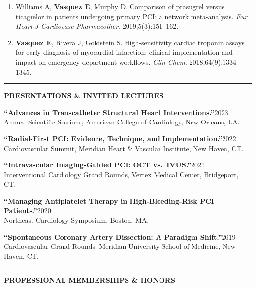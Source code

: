\documentclass[11pt,a4paper]{article}
\newcommand{\cvsection}[1]{%
  \vspace{1.2em}%
  \noindent
  {\color{primary}\rule{3.5pt}{15pt}}\hspace{8pt}%
  {\color{primary}\Large\bfseries\MakeUppercase{#1}}%
  \vspace{0.2em}%
  \par\noindent{\color{primary!25}\rule{\textwidth}{0.5pt}}%
  \vspace{0.6em}%
}
\begin{document}
{\begin{enumerate}[leftmargin=*, itemsep=2pt, topsep=0pt]
\item Williams A, \textbf{Vasquez E}, Murphy D. Comparison of prasugrel versus ticagrelor in patients undergoing primary PCI: a network meta-analysis. \textit{Eur Heart J Cardiovasc Pharmacother}. 2019;5(3):151--162.

\item \textbf{Vasquez E}, Rivera J, Goldstein S. High-sensitivity cardiac troponin assays for early diagnosis of myocardial infarction: clinical implementation and impact on emergency department workflows. \textit{Clin Chem}. 2018;64(9):1334--1345.

\end{enumerate}
}

\cvsection{Presentations \& Invited Lectures}

\vspace{-2pt}
{\color{darktext}
\noindent\textbf{\color{primary}``Advances in Transcatheter Structural Heart Interventions.''}\hfill 2023\\
Annual Scientific Sessions, American College of Cardiology, New Orleans, LA.

\vspace{3pt}
\noindent\textbf{\color{primary}``Radial-First PCI: Evidence, Technique, and Implementation.''}\hfill 2022\\
Cardiovascular Summit, Meridian Heart \& Vascular Institute, New Haven, CT.

\vspace{3pt}
\noindent\textbf{\color{primary}``Intravascular Imaging-Guided PCI: OCT vs.\ IVUS.''}\hfill 2021\\
Interventional Cardiology Grand Rounds, Vertex Medical Center, Bridgeport, CT.

\vspace{3pt}
\noindent\textbf{\color{primary}``Managing Antiplatelet Therapy in High-Bleeding-Risk PCI Patients.''}\hfill 2020\\
Northeast Cardiology Symposium, Boston, MA.

\vspace{3pt}
\noindent\textbf{\color{primary}``Spontaneous Coronary Artery Dissection: A Paradigm Shift.''}\hfill 2019\\
Cardiovascular Grand Rounds, Meridian University School of Medicine, New Haven, CT.
}

\cvsection{Professional Memberships \& Honors}
\end{document}
